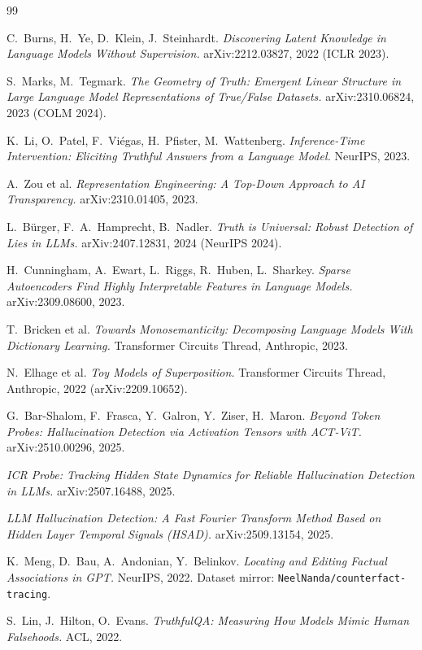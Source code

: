 \documentclass[11pt]{article}
\begin{document}
\begin{thebibliography}{99}

 C.~Burns, H.~Ye, D.~Klein, J.~Steinhardt.
\emph{Discovering Latent Knowledge in Language Models Without Supervision.}
arXiv:2212.03827, 2022 (ICLR 2023).

 S.~Marks, M.~Tegmark.
\emph{The Geometry of Truth: Emergent Linear Structure in Large Language Model Representations of True/False Datasets.}
arXiv:2310.06824, 2023 (COLM 2024).

 K.~Li, O.~Patel, F.~Vi\'egas, H.~Pfister, M.~Wattenberg.
\emph{Inference-Time Intervention: Eliciting Truthful Answers from a Language Model.}
NeurIPS, 2023.

 A.~Zou et al.
\emph{Representation Engineering: A Top-Down Approach to AI Transparency.}
arXiv:2310.01405, 2023.

 L.~B\"urger, F.~A.~Hamprecht, B.~Nadler.
\emph{Truth is Universal: Robust Detection of Lies in LLMs.}
arXiv:2407.12831, 2024 (NeurIPS 2024).

 H.~Cunningham, A.~Ewart, L.~Riggs, R.~Huben, L.~Sharkey.
\emph{Sparse Autoencoders Find Highly Interpretable Features in Language Models.}
arXiv:2309.08600, 2023.

 T.~Bricken et al.
\emph{Towards Monosemanticity: Decomposing Language Models With Dictionary Learning.}
Transformer Circuits Thread, Anthropic, 2023.

 N.~Elhage et al.
\emph{Toy Models of Superposition.}
Transformer Circuits Thread, Anthropic, 2022 (arXiv:2209.10652).

 G.~Bar-Shalom, F.~Frasca, Y.~Galron, Y.~Ziser, H.~Maron.
\emph{Beyond Token Probes: Hallucination Detection via Activation Tensors with ACT-ViT.}
arXiv:2510.00296, 2025.

 \emph{ICR Probe: Tracking Hidden State Dynamics for Reliable Hallucination Detection in LLMs.}
arXiv:2507.16488, 2025.

 \emph{LLM Hallucination Detection: A Fast Fourier Transform Method Based on Hidden Layer Temporal Signals (HSAD).}
arXiv:2509.13154, 2025.

 K.~Meng, D.~Bau, A.~Andonian, Y.~Belinkov.
\emph{Locating and Editing Factual Associations in GPT.}
NeurIPS, 2022. Dataset mirror: \texttt{NeelNanda/counterfact-tracing}.

 S.~Lin, J.~Hilton, O.~Evans.
\emph{TruthfulQA: Measuring How Models Mimic Human Falsehoods.}
ACL, 2022.

\end{thebibliography}
\end{document}
